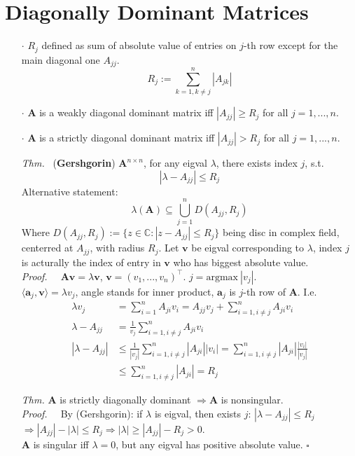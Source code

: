 \documentclass[a4paper, 11pt]{article}
\begin{document}
\section{Diagonally Dominant Matrices}
\begin{itemize}
  \item[$\cdot$] $R_j$ defined as sum of absolute value of entries on $j$-th row except for the main diagonal one $A_{jj}$.
  $$
  R_j:=\sum_{k=1, k\ne j}^n |A_{jk}|
  $$
  \item[$\cdot$] $\bm{A}$ is a weakly diagonal dominant matrix iff $|A_{jj}|\geq R_j$ for all $j=1,...,n$.
  \item[$\cdot$] $\bm{A}$ is a strictly diagonal dominant matrix iff $|A_{jj}|>R_j$ for all $j=1,...,n$.
  \item[\textit{Thm.~}] (\textbf{Gershgorin}) $\bm{A}^{n\times n}$, for any eigval $\lambda$, there exists index $j$, s.t.
  $$
  |\lambda - A_{jj}| \leq R_j
  $$
  Alternative statement:
  $$
  \lambda(\bm{A}) \subseteq \bigcup_{j=1}^{n}D(A_{jj}, R_j)
  $$
  Where $D(A_{jj}, R_j):=\{z\in \mathbb{C}: |z-A_{jj}|\leq R_j\}$ being disc in complex field, centerred at $A_{jj}$, with radius $R_j$. Let $\bm{v}$ be eigval corresponding to $\lambda$, index $j$ is acturally the index of entry in $\bm{v}$ who has biggest absolute value.\\
  \textit{Proof.~~} $\bm{Av}=\lambda \bm{v}$, $\bm{v}=(v_1, ..., v_n)^{\top}$. $j=\text{argmax}~|v_j|$.\\
  $\langle \bm{a}_j, \bm{v} \rangle = \lambda v_j$, angle stands for inner product, $\bm{a}_j$ is $j$-th row of $\bm{A}$. I.e.
  \begin{equation*}
    \begin{split}
    \lambda v_j &= \sum_{i=1}^n A_{ji} v_i = A_{jj}v_j +\sum_{i=1, i\ne j}^n A_{ji} v_i \\
    \lambda-A_{jj} &= \frac{1}{v_j}\sum_{i=1, i\ne j}^n A_{ji}v_i\\
    |\lambda-A_{jj}| &\leq \frac{1}{|v_j|}\sum_{i=1, i\ne j}^n |A_{ji}||v_i| =\sum_{i=1, i\ne j}^n |A_{ji}|\frac{|v_i|}{|v_j|}\\
    &\leq \sum_{i=1, i\ne j}^n |A_{ji}| = R_j
    \end{split}
  \end{equation*}

  \item[\textit{Thm.}] $\bm{A}$ is strictly diagonally dominant $\Rightarrow \bm{A}$ is nonsingular.\\
  \textit{Proof.~~} By (Gershgorin): if $\lambda$ is eigval, then exists $j$: $|\lambda - A_{jj}| \leq R_j$ \\
  $\Rightarrow |A_{jj}| - |\lambda| \leq R_j \Rightarrow |\lambda|\geq |A_{jj}|-R_j > 0$.\\
  $\bm{A}$ is singular iff $\lambda =0$, but any eigval has positive absolute value. $\square$


\end{itemize}
\end{document}
